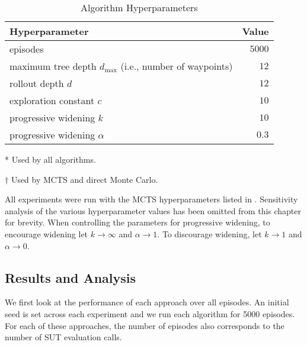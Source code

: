 \begin{table}[!ht]
  \small
  \centering
  \caption{\label{tab:mcts_params} Algorithm Hyperparameters}
  \begin{threeparttable}
  \begin{tabular}{@{}p{10cm}r@{}}
    \toprule
    \textbf{Hyperparameter} & \textbf{Value} \\
    \midrule
    episodes \tnote{*} & $5000$ \\
    maximum tree depth $d_\text{max}$ (i.e., number of waypoints) \tnote{*} & $12$ \\
    rollout depth $d$ \tnote{$\dagger$} & $12$ \\
    exploration constant $c$ & $10$ \\
    progressive widening $k$ & $10$ \\
    progressive widening $\alpha$ & $0.3$ \\
    \bottomrule
  \end{tabular}
  \begin{tablenotes}
      \item[*] {Used by all algorithms.}
      \item[$\dagger$] {Used by MCTS and direct Monte Carlo.}
  \end{tablenotes}
  \end{threeparttable}
\end{table}


All experiments were run with the MCTS hyperparameters listed in .
Sensitivity analysis of the various hyperparameter values has been omitted from this chapter for brevity.
When controlling the parameters for progressive widening, to encourage widening let $k \to \infty$ and $\alpha \to 1$. To discourage widening, let $k \to 1$ and $\alpha \to 0$.



\subsection{Results and Analysis}\label{sec:ast_results}

We first look at the performance of each approach over all episodes.
An initial seed is set across each experiment and we run each algorithm for 5000 episodes.
For each of these approaches, the number of episodes also corresponds to the number of SUT evaluation calls.

